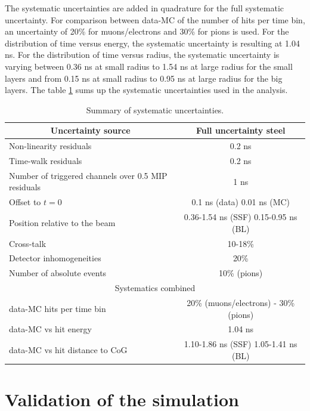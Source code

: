 The systematic uncertainties are added in quadrature for the full systematic uncertainty. For comparison between data-MC of the number of hits per time bin, an uncertainty of 20\% for muons/electrons and 30\% for pions is used. For the distribution of time versus energy, the systematic uncertainty is resulting at 1.04 ns. For the distribution of time versus radius, the systematic uncertainty is varying between 0.36 ns at small radius to 1.54 ns at large radius for the small layers and from 0.15 ns at small radius to 0.95 ns at large radius for the big layers. The table \ref{table:time_syst} sums up the systematic uncertainties used in the analysis.
{
\renewcommand{\arraystretch}{1.2}
\begin{table}[htb!]
	\centering
	\caption{Summary of systematic uncertainties.}
	\label{table:time_syst}
	\begin{tabular}{@{} |l|c| @{}}
		\hline
		\multicolumn{1}{|c|}{Uncertainty source} & Full uncertainty steel \\
		\hline
		Non-linearity residuals & 0.2 ns \\
		Time-walk residuals & 0.2 ns \\
		Number of triggered channels over 0.5 MIP residuals & 1 ns \\
		Offset to $t=0$ & 0.1 ns (data) 0.01 ns (MC) \\
		Position relative to the beam & 0.36-1.54 ns (SSF) 0.15-0.95 ns (BL) \\
		Cross-talk & 10-18\% \\
		Detector inhomogeneities & 20\% \\
		Number of absolute events & 10\% (pions) \\
		\hline
		\hline
		\multicolumn{2}{|c|}{Systematics combined} \\
		\hline
		data-MC hits per time bin & 20\% (muons/electrons) - 30\% (pions) \\
		data-MC vs hit energy & 1.04 ns \\
		data-MC vs hit distance to CoG & 1.10-1.86 ns (SSF) 1.05-1.41 ns (BL) \\
		\hline
	\end{tabular}
\end{table}
}

\section{Validation of the simulation}

